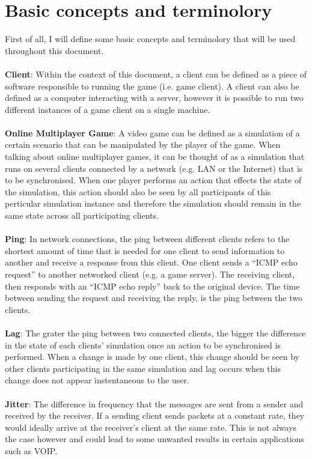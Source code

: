 \section{Basic concepts and terminolory}
First of all, I will define some basic concepts and terminolory that will be used throughout this document.
\\
\\
\textbf{Client}: Within the context of this document, a client can be defined as a piece of software responsible to running the game (i.e. game client). A client can also be defined as a computer interacting with a server, however it is possible to run two different instances of a game client on a single machine.
\\
\\
\textbf{Online Multiplayer Game}: A video game can be defined as a simulation of a certain scenario that can be manipulated by the player of the game. When talking about online multiplayer games, it can be thought of as a simulation that runs on several clients connected by a network (e.g. LAN or the Internet) that is to be synchronised. When one player performs an action that effects the state of the simulation, this action should also be seen by all participants of this perticular simulation instance and therefore the simulation should remain in the same state across all participating clients.
\\
\\
\textbf{Ping}: In network connections, the ping between different clients refers to the shortest amount of time that is needed for one client to send information to another and receive a response from this client. One client sends a ``ICMP echo request'' to another networked client (e.g. a game server). The receiving client, then responds with an ``ICMP echo reply'' back to the original device. The time between sending the request and receiving the reply, is the ping between the two clients.
\\
\\
\textbf{Lag}: The grater the ping between two connected clients, the bigger the difference in the state of each clients' simulation once an action to be synchronised is performed. When a change is made by one client, this change should be seen by other clients participating in the same simulation and lag occurs when this change does not appear instentaneous to the user.
\\
\\
\textbf{Jitter}: The difference in frequency that the messages are sent from a sender and received by the receiver. If a sending client sends packets at a constant rate, they would ideally arrive at the receiver's client at the same rate. This is not always the case however and could lead to some unwanted results in certain applications such as VOIP.



